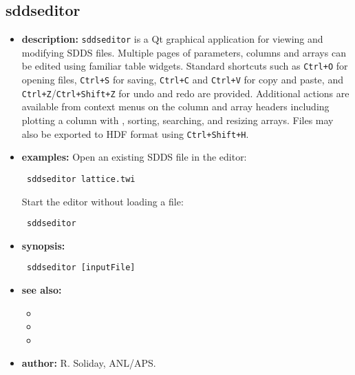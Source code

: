 \newpage
\subsection{sddseditor}
\label{sddseditor}

\begin{itemize}
\item {\bf description:} \verb|sddseditor| is a Qt graphical application for viewing
and modifying SDDS files.  Multiple pages of parameters, columns and arrays can be
edited using familiar table widgets.  Standard shortcuts such as
\verb|Ctrl+O| for opening files, \verb|Ctrl+S| for saving, \verb|Ctrl+C| and
\verb|Ctrl+V| for copy and paste, and \verb|Ctrl+Z|/\verb|Ctrl+Shift+Z| for
undo and redo are provided.  Additional actions are available from context menus
on the column and array headers including plotting a column with
, sorting, searching, and resizing arrays.  Files may also be
exported to HDF format using \verb|Ctrl+Shift+H|.

\item {\bf examples:}
Open an existing SDDS file in the editor:
\begin{flushleft}{\tt
sddseditor lattice.twi
}\end{flushleft}
Start the editor without loading a file:
\begin{flushleft}{\tt
sddseditor
}\end{flushleft}

\item {\bf synopsis:}
\begin{flushleft}{\tt
sddseditor [inputFile]
}\end{flushleft}

\item {\bf see also:}
    \begin{itemize}
    \item {}
    \item {}
    \item {}
    \end{itemize}
\item {\bf author:} R. Soliday, ANL/APS.
\end{itemize}
